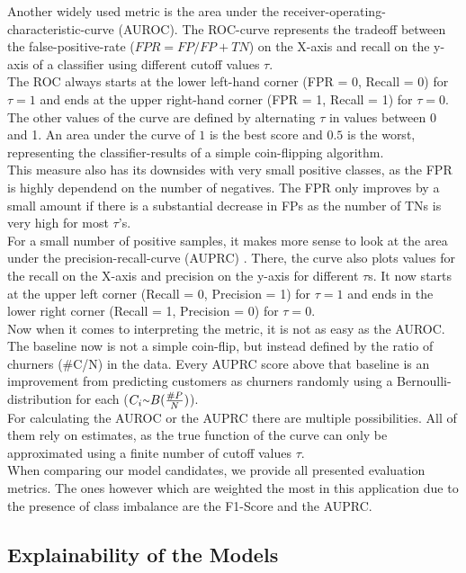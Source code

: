 \documentclass[12pt,titlepage]{article}
\begin{document}
\noindent
Another widely used metric is the area under the receiver-operating-characteristic-curve (AUROC). The ROC-curve represents the tradeoff between the false-positive-rate ($FPR=FP/FP+TN$) on the X-axis and recall on the y-axis of a classifier using different cutoff values $\tau$. \\
The ROC always starts at the lower left-hand corner (FPR = 0, Recall = 0) for $\tau=1$ and ends at the upper right-hand corner (FPR = 1, Recall = 1) for $\tau=0$. The other values of the curve are defined by alternating $\tau$ in values between 0 and 1. An area under the curve of $1$ is the best score and $0.5$ is the worst, representing the classifier-results of a simple coin-flipping algorithm. \\
This measure also has its downsides with very small positive classes, as the FPR is highly dependend on the number of negatives. The FPR only improves by a small amount if there is a substantial decrease in FPs as the number of TNs is very high for most $\tau$'s. \\
For a small number of positive samples, it makes more sense to look at the area under the precision-recall-curve (AUPRC) \cite{auprc}. There, the curve also plots values for the recall on the X-axis and precision on the y-axis for different $\tau$s. It now starts at the upper left corner (Recall = 0, Precision = 1) for $\tau=1$ and ends in the lower right corner (Recall = 1, Precision = 0) for $\tau=0$. \\
Now when it comes to interpreting the metric, it is not as easy as the AUROC. The baseline now is not a simple coin-flip, but instead defined by the ratio of churners (\#C/N) in the data. Every AUPRC score above that baseline is an improvement from predicting customers as churners randomly using a Bernoulli-distribution for each ($C_{i}{\raise.17ex\hbox{$\scriptstyle\mathtt{\sim}$}} B(\frac{\#P}{N})$). \\
For calculating the AUROC or the AUPRC there are multiple possibilities. All of them rely on estimates, as the true function of the curve can only be approximated using a finite number of cutoff values $\tau$. \\

When comparing our model candidates, we provide all presented evaluation metrics. The ones however which are weighted the most in this application due to the presence of class imbalance are the F1-Score and the AUPRC. \\

\subsection{Explainability of the Models} \par
\label{section:interpreting}
\end{document}
